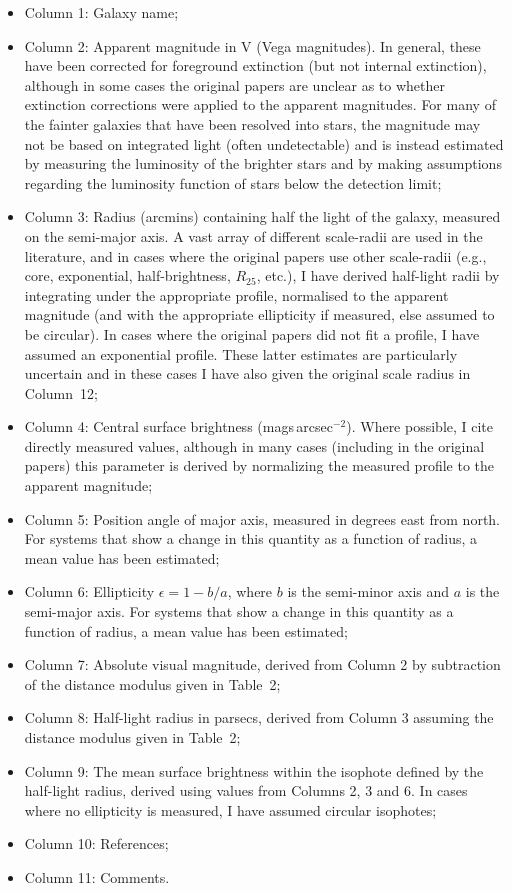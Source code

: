 \documentclass[manuscript]{aastex}
\begin{document}
\begin{itemize}
\item Column 1: Galaxy name;
\item Column 2: Apparent magnitude in V (Vega magnitudes). In general,
  these have been corrected for foreground extinction (but not
  internal extinction), although in some cases
  the original papers are unclear as to whether extinction corrections
  were applied to the apparent magnitudes. For many of the fainter
  galaxies that have been resolved into stars, the magnitude may not
  be based on integrated light (often undetectable) and is instead estimated by measuring
  the luminosity of the brighter stars and by making assumptions
  regarding the luminosity function of stars below the detection
  limit;
\item Column 3: Radius (arcmins) containing half the light of the
  galaxy, measured on the semi-major axis. A vast array of different
  scale-radii are used in the literature, and in cases where the original
  papers use other scale-radii (e.g., core, exponential,
  half-brightness, $R_{25}$, etc.), I have derived half-light radii by
  integrating under the appropriate profile, normalised to the
  apparent magnitude (and with the appropriate ellipticity if
  measured, else assumed to be circular). In
  cases where the original papers did not fit a profile, I have assumed
  an exponential profile. These latter estimates are particularly
  uncertain and in these cases I have also given the original scale
  radius in Column~12;
\item Column 4: Central surface brightness
  (mags\,arcsec$^{-2}$). Where possible, I cite directly measured
  values, although in many cases (including in the original papers)
  this parameter is derived by normalizing the measured profile to the
  apparent magnitude;
\item Column 5: Position angle of major axis, measured in degrees east
  from north. For systems that show a change in this quantity as a
  function of radius, a mean value has been estimated;
\item Column 6: Ellipticity $\epsilon = 1 - b/a$, where $b$ is the
  semi-minor axis and $a$ is the semi-major axis. For systems that
  show a change in this quantity as a function of radius, a mean value
  has been estimated;
\item Column 7: Absolute visual magnitude, derived from Column 2 by subtraction of the
  distance modulus  given in Table~2;
\item Column 8: Half-light radius in parsecs, derived from Column 3 assuming the distance
  modulus given in Table~2;
\item Column 9: The mean surface brightness within the isophote
  defined by the half-light
  radius, derived using values from Columns 2, 3 and 6. In cases where
  no ellipticity is measured, I have assumed circular isophotes;
\item Column 10: References;
\item Column 11: Comments.
\end{itemize}
\end{document}
